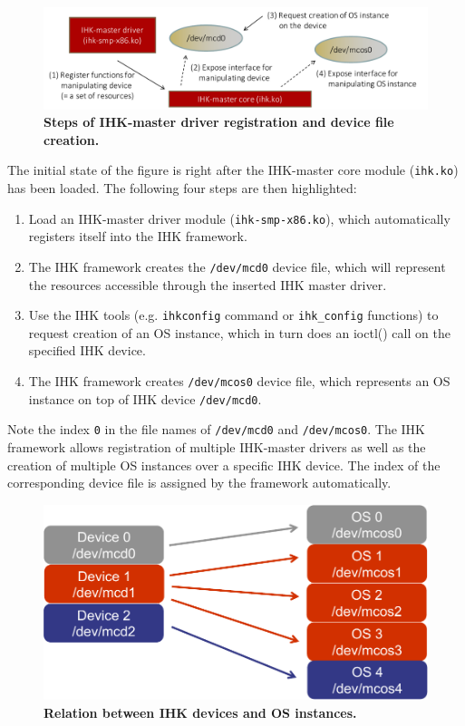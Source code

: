 \documentclass[twoside,11pt,fleqn]{book}
\begin{document}
\begin{figure}[h!]
\centerline{
	\includegraphics[width=0.90\linewidth]{figs/ihk-os_creation.pdf}
}
\caption{\textbf{Steps of IHK-master driver registration and device file creation.}}
\label{fig:ihk-os_creation}
\end{figure}

The initial state of the figure is right after the IHK-master core module (\texttt{ihk.ko}) has been
loaded. The following four steps are then highlighted:
\begin{enumerate}
	\item Load an IHK-master driver module (\texttt{ihk-smp-x86.ko}), which automatically registers
	itself into the IHK framework.
	\item The IHK framework creates the \texttt{/dev/mcd0} device file,
	which will represent the resources accessible through the inserted
	IHK master driver.
	\item Use the IHK tools (e.g. \texttt{ihkconfig} command or \texttt{ihk\_config} functions) to request creation of an OS instance, which in turn does an ioctl()
	call on the specified IHK device.
	\item The IHK framework creates \texttt{/dev/mcos0} device file, which
	represents an OS instance on top of IHK device \texttt{/dev/mcd0}.
\end{enumerate}

Note the index \texttt{0} in the file names of \texttt{/dev/mcd0} and
\texttt{/dev/mcos0}. The IHK framework allows registration of multiple
IHK-master drivers as well as the creation of multiple OS instances over
a specific IHK device. The index of the corresponding device file is
assigned by the framework automatically.

\begin{figure}[h!]
\centerline{
	\includegraphics[width=0.50\linewidth]{figs/ihk-dev-os.pdf}
}
\caption{\textbf{Relation between IHK devices and OS instances.}}
\label{fig:ihk-dev-os}
\end{figure}
\end{document}
